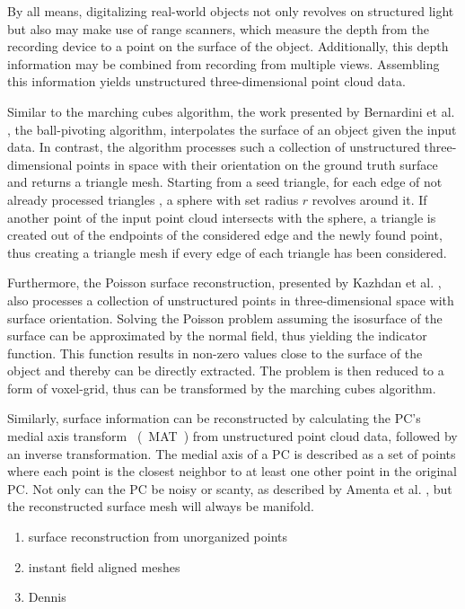 By all means, digitalizing real-world objects not only revolves on structured light but also may make use of range scanners, which measure the depth from the recording device to a point on the surface of the object. Additionally, this depth information may be combined from recording from multiple views. Assembling this information yields unstructured three-dimensional point cloud data. 

Similar to the marching cubes algorithm, the work presented by 
  Bernardini et al. \cite{817351}, the ball-pivoting algorithm, 
  interpolates the surface of an object given the input data.
  In contrast, the algorithm processes such a collection of unstructured 
  three-dimensional points in space with their orientation on the
  ground truth surface and returns a triangle mesh. Starting from
   a seed triangle, for each edge of not already processed triangles
   , a sphere with set radius $r$ revolves around it. If another point
    of the input point cloud intersects with the sphere, a triangle is 
    created out of the endpoints of the considered edge and the newly 
    found point, thus creating a triangle mesh if every edge of each 
    triangle has been considered. 
  

    Furthermore, the Poisson surface reconstruction, 
    presented by Kazhdan et al. \cite{Kazhdan:2006:PSR:1281957.1281965}, also processes a
     collection of unstructured points in three-dimensional
      space with surface orientation. Solving the Poisson problem 
      \cite{Genovese2006} assuming the isosurface of the surface can be 
      approximated by the normal field, thus yielding the
       indicator function. This function results in non-zero
        values close to the surface of the object and thereby 
        can be directly extracted. The problem is then reduced to a 
        form of voxel-grid, thus can be transformed by the marching
         cubes algorithm.

 Similarly, surface information can be reconstructed by calculating 
 the PC's medial axis transform ~(~MAT~) from unstructured point cloud
  data, followed by an inverse transformation.  The medial axis of a PC
   is described as a set of points where each point is the closest neighbor 
   to at least one other point in the original PC. Not only can the PC be noisy 
   or scanty, as described by Amenta et al. \cite{Groh2017}, but the reconstructed
    surface mesh will always be manifold.
    
  
  
\begin{enumerate}
  \item surface reconstruction from unorganized points
  \item instant field aligned meshes
  \item Dennis \cite{bukenberger2018hierarchical}
\end{enumerate}


